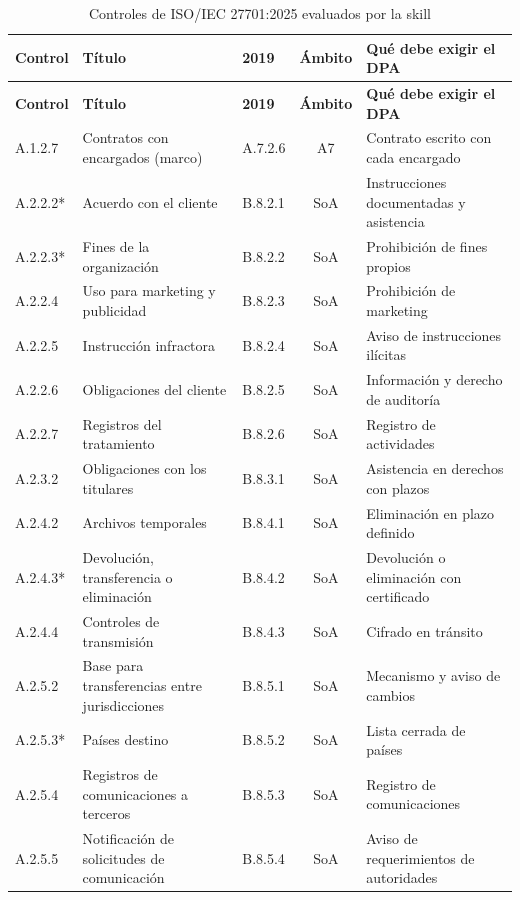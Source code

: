 \documentclass[12pt,letterpaper]{article}
\begin{document}
\begin{small}
\begin{longtable}{@{}l L{5.2cm} l c L{4.0cm}@{}}
\caption{Controles de ISO/IEC 27701:2025 evaluados por la skill}\label{tab:controles}\\
\toprule
\textbf{Control} & \textbf{Título} & \textbf{2019} & \textbf{Ámbito} & \textbf{Qué debe exigir el DPA} \\
\midrule
\endfirsthead
\toprule
\textbf{Control} & \textbf{Título} & \textbf{2019} & \textbf{Ámbito} & \textbf{Qué debe exigir el DPA} \\
\midrule
\endhead
\bottomrule
\endfoot
A.1.2.7 & Contratos con encargados (marco) & A.7.2.6 & A7 & Contrato escrito con cada encargado \\
A.2.2.2* & Acuerdo con el cliente & B.8.2.1 & SoA & Instrucciones documentadas y asistencia \\
A.2.2.3* & Fines de la organización & B.8.2.2 & SoA & Prohibición de fines propios \\
A.2.2.4 & Uso para marketing y publicidad & B.8.2.3 & SoA & Prohibición de marketing \\
A.2.2.5 & Instrucción infractora & B.8.2.4 & SoA & Aviso de instrucciones ilícitas \\
A.2.2.6 & Obligaciones del cliente & B.8.2.5 & SoA & Información y derecho de auditoría \\
A.2.2.7 & Registros del tratamiento & B.8.2.6 & SoA & Registro de actividades \\
A.2.3.2 & Obligaciones con los titulares & B.8.3.1 & SoA & Asistencia en derechos con plazos \\
A.2.4.2 & Archivos temporales & B.8.4.1 & SoA & Eliminación en plazo definido \\
A.2.4.3* & Devolución, transferencia o eliminación & B.8.4.2 & SoA & Devolución o eliminación con certificado \\
A.2.4.4 & Controles de transmisión & B.8.4.3 & SoA & Cifrado en tránsito \\
A.2.5.2 & Base para transferencias entre jurisdicciones & B.8.5.1 & SoA & Mecanismo y aviso de cambios \\
A.2.5.3* & Países destino & B.8.5.2 & SoA & Lista cerrada de países \\
A.2.5.4 & Registros de comunicaciones a terceros & B.8.5.3 & SoA & Registro de comunicaciones \\
A.2.5.5 & Notificación de solicitudes de comunicación & B.8.5.4 & SoA & Aviso de requerimientos de autoridades \\

\end{longtable}
\end{small}
\end{document}
